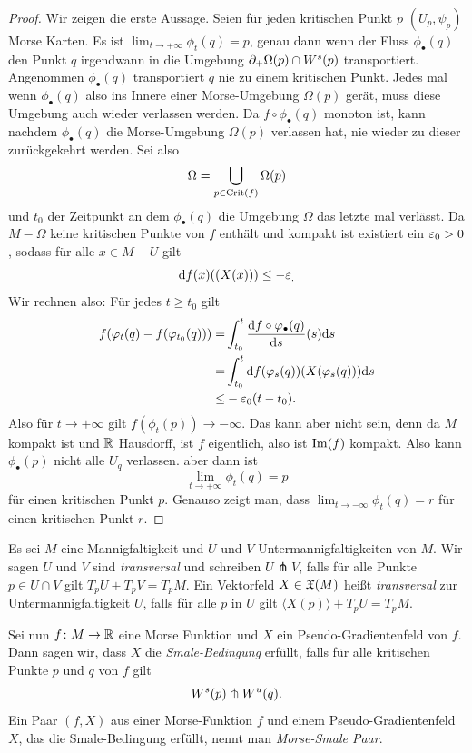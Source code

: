 \begin{proof}
    Wir zeigen die erste Aussage. Seien für jeden kritischen Punkt $p$ $(U_p, \psi_p)$ Morse Karten.
    Es ist $\lim_{t \to + \infty} \phi_t(q) = p$, genau dann wenn
    der Fluss $\phi_{\bullet}(q)$ den Punkt $q$ irgendwann in die Umgebung 
    ${ \partial }_+ \Omega (p) \cap { W^s }(p)$ transportiert. Angenommen $\phi_{\bullet}(q)$ transportiert
    $q$ nie zu einem kritischen Punkt. Jedes mal wenn $\phi_{\bullet}(q)$ also ins Innere einer
    Morse-Umgebung $\Omega(p)$ gerät, muss diese Umgebung auch wieder verlassen werden. Da 
    $f \circ \phi_{\bullet}(q)$ monoton ist, kann nachdem $\phi_{\bullet}(q)$ die Morse-Umgebung 
    $\Omega (p)$ verlassen hat, nie wieder zu dieser zurückgekehrt werden.
    Sei also 
    \[ \Omega = \bigcup_{p \in { \operatorname{Crit} }(f)} \Omega (p) \]
    und $t_0$ der Zeitpunkt an dem $\phi_{\bullet} (q)$ die Umgebung $\Omega$ das letzte mal verlässt.
    Da $M - \Omega$ keine kritischen Punkte von $f$ enthält und kompakt ist existiert ein 
    $\varepsilon_0 > 0$, sodass für 
    alle $x \in M - U$ gilt 
    \[ { \operatorname{d} } f (x) ((X(x))) \leq - \varepsilon_ . \]
    Wir rechnen also: Für jedes $t \geq t_0$ gilt
    \begin{align*}
        f(\varphi_t(q) - f(\varphi_{t_0}(q))) = & 
            \int_{t_0}^t \derive[f \circ \phi_{\bullet}(q)]{s} (s) \opd s \\
        = & \int_{t_0}^t \opd f (\phi_s(q)) (X(\phi_s(q))) \opd s \\
        \leq & - \eps_0 (t - t_0) . 
    \end{align*}
    Also für $t \to + \infty$ gilt $f(\phi_t(p)) \to - \infty$. Das kann aber nicht sein, denn da 
    $M$ kompakt ist und ${ \mathbb R }$ Hausdorff, ist $f$ eigentlich, also ist ${ \operatorname{Im} } (f)$ kompakt. 
    Also kann $\phi_{\bullet}(p)$ nicht alle $U_q$ verlassen. aber dann ist 
    \[ \lim_{t \to + \infty} \phi_t(q) = p \]
    für einen kritischen Punkt $p$.
    Genauso zeigt man, dass $\lim_{t \to - \infty} \phi_t(q) = r$ für einen kritischen Punkt $r$.
\end{proof}

\begin{definition}
    \label{def: smale-bedingung}
    Es sei $M$ eine Mannigfaltigkeit und $U$ und $V$ Untermannigfaltigkeiten von $M$. Wir sagen 
    $U$ und $V$ sind \textit{transversal} und schreiben $U \pitchfork V$, falls für alle Punkte 
    $p \in U \cap V$ gilt $T_pU + T_pV = T_pM$. Ein Vektorfeld $X \in { \mathfrak{X} } (M)$ heißt 
    \textit{transversal} zur Untermannigfaltigkeit $U$, falls für alle $p$ in $U$ gilt 
    $\langle X(p) \rangle + T_pU = T_pM$.

    Sei nun $f \colon M \to { \mathbb R }$ eine Morse Funktion und $X$ ein Pseudo-Gradientenfeld von $f$. Dann 
    sagen wir, dass $X$ die \textit{Smale-Bedingung} erfüllt, falls für alle kritischen Punkte 
    $p$ und $q$ von $f$ gilt 
    \[ { W^s } (p) \pitchfork { W^u } (q) . \]
    Ein Paar $(f, X)$ aus einer Morse-Funktion $f$ und einem Pseudo-Gradientenfeld $X$, das die 
    Smale-Bedingung erfüllt, nennt man \textit{Morse-Smale Paar}.
\end{definition}

